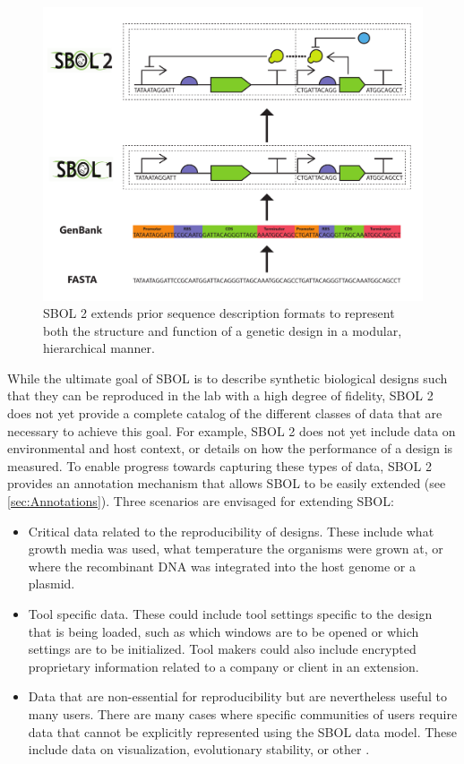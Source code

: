 \begin{figure}[htbp]
\centering
\includegraphics[width=\textwidth]{images/standard-evolution.pdf}
\caption{SBOL 2 extends prior sequence description formats to represent both the structure and function of a genetic design in a modular, hierarchical manner.}
\label{f:sequence}
\end{figure}


While the ultimate goal of SBOL is to describe synthetic biological designs such that they can be reproduced in the lab with a high degree of fidelity, SBOL 2 does not yet provide a complete catalog of the different classes of data that are necessary to achieve this goal. 
For example, SBOL 2 does not yet include data on environmental and host context, or details on how the performance of a design is measured. 
To enable progress towards capturing these types of data, SBOL 2 provides an annotation mechanism that allows SBOL to be easily extended (see \ref{sec:Annotations}). Three scenarios are envisaged for extending SBOL:

\begin{itemize}
\item Critical data related to the reproducibility of designs. These include  what growth media was used, what temperature the organisms were grown at, or where the recombinant DNA was integrated into the host genome or a plasmid.
\item Tool specific data. These could include tool settings specific to the design that is being loaded, such as which windows are to be opened or which settings are to be initialized. Tool makers could also include encrypted proprietary information related to a company or client in an extension. 
\item Data that are non-essential for  reproducibility but are nevertheless useful to many users. There are many cases where specific communities of users require data that cannot be explicitly represented using the SBOL data model. These include data on visualization, evolutionary stability, or other .
\end{itemize}

